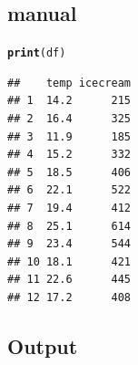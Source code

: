 \documentclass[slidestop,compress,14pt,xcolor=dvipsnames]{beamer}\usepackage[]{graphicx}\usepackage[]{color}
\makeatletter
\newcommand{\hlstd}[1]{\textcolor[rgb]{0.345,0.345,0.345}{#1}}%
\newcommand{\hlkwd}[1]{\textcolor[rgb]{0.737,0.353,0.396}{\textbf{#1}}}%
\newenvironment{kframe}{%
 \def\at@end@of@kframe{}%
 \ifinner\ifhmode%
  \def\at@end@of@kframe{\end{minipage}}%
  \begin{minipage}{\columnwidth}%
 \fi\fi%
 \def\FrameCommand##1{\hskip\@totalleftmargin \hskip-\fboxsep
 \colorbox{shadecolor}{##1}\hskip-\fboxsep
     \hskip-\linewidth \hskip-\@totalleftmargin \hskip\columnwidth}%
 \MakeFramed {\advance\hsize-\width
   \@totalleftmargin\z@ \linewidth\hsize
   \@setminipage}}%
 {\par\unskip\endMakeFramed%
 \at@end@of@kframe}
\newenvironment{knitrout}{}{} %
\makeatother
\begin{document}
\subsection{manual}

\begingroup
\fontsize{7pt}{9pt}\selectfont



\begin{knitrout}
\color{fgcolor}\begin{kframe}
\begin{alltt}
\hlkwd{print}\hlstd{(df)}
\end{alltt}
\begin{verbatim}
##    temp icecream
## 1  14.2      215
## 2  16.4      325
## 3  11.9      185
## 4  15.2      332
## 5  18.5      406
## 6  22.1      522
## 7  19.4      412
## 8  25.1      614
## 9  23.4      544
## 10 18.1      421
## 11 22.6      445
## 12 17.2      408
\end{verbatim}
\end{kframe}
\end{knitrout}







\subsection{Output}

\clearpage 
\end{document}
